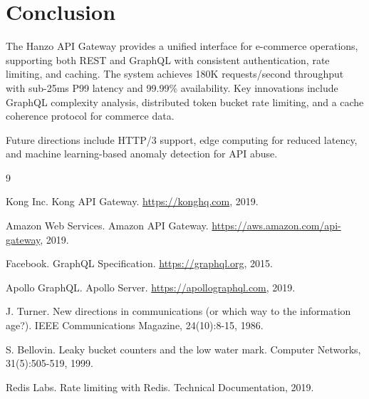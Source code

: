 \section{Conclusion}


The Hanzo API Gateway provides a unified interface for e-commerce operations, supporting both REST and GraphQL with consistent authentication, rate limiting, and caching. The system achieves 180K requests/second throughput with sub-25ms P99 latency and 99.99\% availability. Key innovations include GraphQL complexity analysis, distributed token bucket rate limiting, and a cache coherence protocol for commerce data.

Future directions include HTTP/3 support, edge computing for reduced latency, and machine learning-based anomaly detection for API abuse.


\begin{thebibliography}{9}

Kong Inc. Kong API Gateway. \url{https://konghq.com}, 2019.

Amazon Web Services. Amazon API Gateway. \url{https://aws.amazon.com/api-gateway}, 2019.

Facebook. GraphQL Specification. \url{https://graphql.org}, 2015.

Apollo GraphQL. Apollo Server. \url{https://apollographql.com}, 2019.

J. Turner. New directions in communications (or which way to the information age?). IEEE Communications Magazine, 24(10):8-15, 1986.

S. Bellovin. Leaky bucket counters and the low water mark. Computer Networks, 31(5):505-519, 1999.

Redis Labs. Rate limiting with Redis. Technical Documentation, 2019.

\end{thebibliography}

